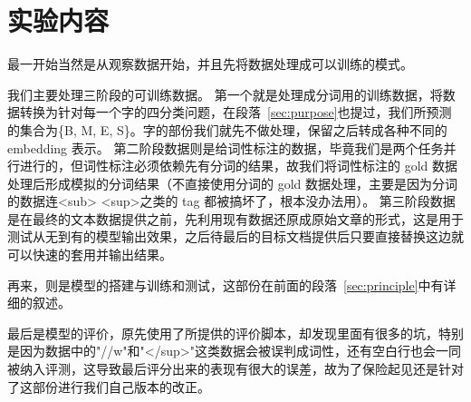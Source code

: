 \section{实验内容}
\label{sec:experiment}

最一开始当然是从观察数据开始，并且先将数据处理成可以训练的模式。

我们主要处理三阶段的可训练数据。
第一个就是处理成分词用的训练数据，将数据转换为针对每一个字的四分类问题，在段落~\ref{sec:purpose}也提过，我们所预测的集合为\{B, M, E, S\}。字的部份我们就先不做处理，保留之后转成各种不同的 embedding 表示。
第二阶段数据则是给词性标注的数据，毕竟我们是两个任务并行进行的，但词性标注必须依赖先有分词的结果，故我们将词性标注的 gold 数据处理后形成模拟的分词结果（不直接使用分词的 gold 数据处理，主要是因为分词的数据连<sub> <sup>之类的 tag 都被搞坏了，根本没办法用）。
第三阶段数据是在最终的文本数据提供之前，先利用现有数据还原成原始文章的形式，这是用于测试从无到有的模型输出效果，之后待最后的目标文档提供后只要直接替换这边就可以快速的套用并输出结果。

再来，则是模型的搭建与训练和测试，这部份在前面的段落~\ref{sec:principle}中有详细的叙述。

最后是模型的评价，原先使用了所提供的评价脚本，却发现里面有很多的坑，特别是因为数据中的"//w"和"</sup>"这类数据会被误判成词性，还有空白行也会一同被纳入评测，这导致最后评分出来的表现有很大的误差，故为了保险起见还是针对了这部份进行我们自己版本的改正。
